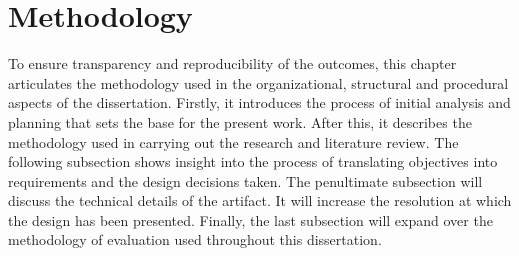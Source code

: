 




\chapter{Methodology}
\label{chap:methodology}

To ensure transparency and reproducibility of the outcomes, this chapter articulates the methodology used in the organizational, structural and procedural aspects of the dissertation. Firstly, it introduces the process of initial analysis and planning that sets the base for the present work. After this, it describes the methodology used in carrying out the research and literature review. The following subsection shows insight into the process of translating objectives into requirements and the design decisions taken. The penultimate subsection will discuss the technical details of the artifact. It will increase the resolution at which the design has been presented. Finally, the last subsection will expand over the methodology of evaluation used throughout this dissertation.


